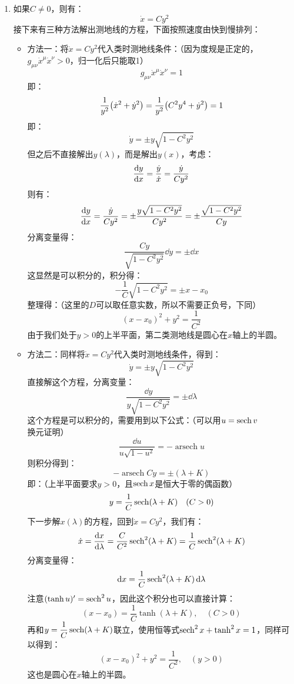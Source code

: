 \documentclass[a4paper]{article}
\DeclareMathOperator{\arsech}{arsech}
\begin{document}
\begin{enumerate}
\begin{enumerate}
        \item[(2)]
        如果$C \neq 0$，则有：
        \[
            \dot{x} = C y^2
        \]
        接下来有三种方法解出测地线的方程，下面按照速度由快到慢排列：
        \begin{itemize}
            \item 方法一：将$\dot{x} = C y^2$代入类时测地线条件：（因为度规是正定的，$g_{\mu\nu} \dot{x}^\mu \dot{x}^\nu > 0$，归一化后只能取1）
            \[
                g_{\mu\nu} \dot{x}^\mu \dot{x}^\nu = 1
            \]
            即：
            \[
                \frac{1}{y^2} \qty(\dot{x}^2 + \dot{y}^2) = \frac{1}{y^2} \qty(C^2 y^4 + \dot{y}^2) = 1
            \]
            即：
            \[
                \dot{y} = \pm y \sqrt{1 - C^2 y^2}
            \]
            但之后不直接解出$y(\lambda)$，而是解出$y(x)$，考虑：
            \[
                \dv{y}{x} = \frac{\dot{y}}{\dot{x}} = \frac{\dot{y}}{C y^2}
            \]
            则有：
            \[
                \dv{y}{x} = \frac{\dot{y}}{C y^2} = \pm \frac{y \sqrt{1 - C^2 y^2}}{C y^2} = \pm \frac{\sqrt{1 - C^2 y^2}}{C y}
            \]
            分离变量得：
            \[
                \frac{Cy}{\sqrt{1 - C^2 y^2}} \dd{y} = \pm \dd{x}
            \]
            这显然是可以积分的，积分得：
            \[
                -\frac{1}{C} \sqrt{1 - C^2 y^2} = \pm x - x_0
            \]
            整理得：（这里的$D$可以取任意实数，所以不需要正负号，下同）
            \[
                (x - x_0)^2 + y^2 = \frac{1}{C^2}
            \]
            由于我们处于$y > 0$的上半平面，第二类测地线是圆心在$x$轴上的半圆。

            \item 方法二：同样将$\dot{x} = C y^2$代入类时测地线条件，得到：
            \[
                \dot{y} = \pm y \sqrt{1 - C^2 y^2}
            \]
            直接解这个方程，分离变量：
            \[
                \frac{\dd{y}}{y \sqrt{1 - C^2 y^2}} = \pm \dd{\lambda}
            \]
            这个方程是可以积分的，需要用到以下公式：（可以用$u = \sech{v}$换元证明）
            \[
                \frac{\dd{u}}{u \sqrt{1 - u^2}} = -\arsech{u}
            \]
            则积分得到：
            \[
                -\arsech{Cy} = \pm(\lambda + K)
            \]
            即：（上半平面要求$y > 0$，且$\sech{x}$是恒大于零的偶函数）
            \[
                y = \frac{1}{C} \sech(\lambda + K) \quad (C > 0)
            \]
            下一步解$x(\lambda)$的方程，回到$\dot{x} = Cy^2$，我们有：
            \[
                \dot{x} = \dv{x}{\lambda} = \frac{C}{C^2} \sech^2(\lambda + K) = \frac{1}{C} \sech^2(\lambda + K)
            \]
            分离变量得：
            \[
                \dd{x} = \frac{1}{C} \sech^2(\lambda + K) \dd{\lambda}
            \]
            注意$(\tanh{u})' = \sech^2{u}$，因此这个积分也可以直接计算：
            \[
                (x - x_0) = \frac{1}{C} \tanh(\lambda + K),\quad (C > 0)
            \]
            再和$y = \dfrac{1}{C} \sech(\lambda + K)$联立，使用恒等式$\sech^2{x} + \tanh^2{x} = 1$，同样可以得到：
            \[
                (x - x_0)^2 + y^2 = \frac{1}{C^2},\quad (y > 0)
            \]
            这也是圆心在$x$轴上的半圆。


\end{itemize}
\end{enumerate}
\end{enumerate}
\end{document}
